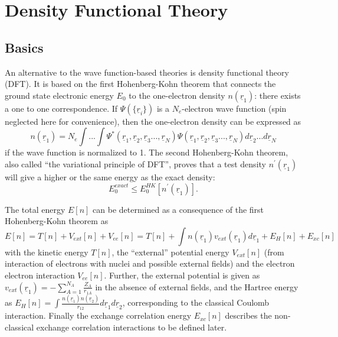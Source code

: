 \documentclass[11pt,DIV=13,BCOR=5mm,a4paper,headinclude]{scrbook}
\renewcommand{\vec}[1]{\underline{#1}}
\begin{document}
\section{Density Functional Theory}
\subsection{Basics}
An alternative to the wave function-based theories is density functional theory (DFT).
It is based on the first Hohenberg-Kohn theorem\cite{Hohenberg-Kohn1964} that connects the ground state electronic energy $E_0$ to the one-electron density $n(\vec{r}_1)$: there exists a one to one correspondence.
If $\Psi(\{\vec{r}_i\})$ is a $N_e$-electron wave function (spin neglected here for convenience), then the one-electron density can be expressed as
\begin{equation}\label{eq:electron-density}
 n(\vec{r}_1)=N_e\int ...
\int \Psi^\ast(\vec{r}_1,\vec{r}_2,\vec{r}_3...,\vec{r}_N)\Psi(\vec{r}_1,\vec{r}_2,\vec{r}_3...,\vec{r}_N) d \vec{r}_2...d \vec{r}_N
\end{equation}
if the wave function is normalized to 1.
The second Hohenberg-Kohn theorem, also called ``the variational principle of DFT'', proves that a test density $n^\prime(\vec{r}_1)$ will give a higher or the same energy as the exact density:
\begin{equation}
 E_0^{exact}\leq E_0^{HK}[n^\prime(\vec{r}_1)].
\end{equation}


The total energy $E[n]$ can be determined as a consequence of the first Hohenberg-Kohn theorem as
\begin{equation}
 E[n]=T[n] + V_{ext}[n] + V_{ee}[n]=T[n]+ \int n(\vec{r}_1)v_{ext}(\vec{r}_1)d\vec{r}_1 + E_H[n]+E_{xc}[n]
\end{equation}
with the kinetic energy $T[n]$, the ``external'' potential energy $V_{ext}[n]$ (from interaction of electrons with nuclei and possible external fields) and the electron electron interaction $V_{ee}[n]$.
Further, the external potential is given as $v_{ext}(\vec{r}_1)=-\sum_{A=1}^{N_A}\frac{Z_A}{r_{1A}}$ in the absence of external fields, and the Hartree energy as $E_H[n]=\int\frac{n(\vec{r}_1)n(\vec{r}_2)}{r_{12}}d\vec{r}_1d\vec{r}_2$, corresponding to the classical Coulomb interaction.
Finally the exchange correlation energy $E_{xc}[n]$ describes the non-classical exchange correlation interactions to be defined later.
\end{document}
